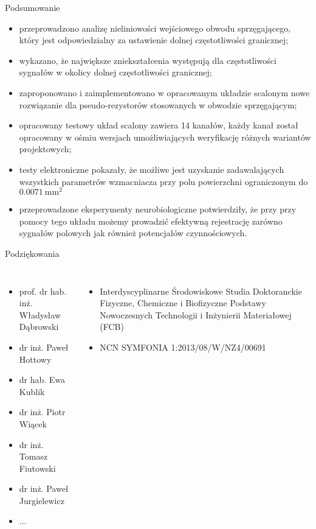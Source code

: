     \begin{frame}{Podsumowanie}
    \begin{itemize}
        \item przeprowadzono analizę nieliniowości wejściowego obwodu sprzęgającego, który jest odpowiedzialny za ustawienie dolnej częstotliwości granicznej;
        \item wykazano, że największe zniekształcenia występują dla częstotliwości sygnałów w okolicy dolnej częstotliwości granicznej;
        \item zaproponowano i zaimplementowano w opracowanym układzie scalonym nowe rozwiązanie dla pseudo-rezystorów stosowanych w obwodzie sprzęgającym;
        \item  opracowany testowy układ scalony zawiera 14 kanałów, każdy kanał został opracowany w ośmiu wersjach umożliwiających weryfikację różnych wariantów projektowych;
        \item testy elektroniczne pokazały, że możliwe jest uzyskanie zadawalających wszystkich parametrów wzmacniacza  przy polu powierzchni  ograniczonym do $\SI{0.0071}{\milli\metre\squared}$ 
        \item przeprowadzone eksperymenty neurobiologiczne potwierdziły, że przy przy pomocy tego układu możemy prowadzić efektywną rejestrację zarówno sygnałów polowych jak również potencjałów czynnościowych.
    \end{itemize}
    \end{frame}

    \begin{frame}{Podziękowania}
      
      \begin{columns}

        \begin{itemize}
          \item prof. dr hab. inż. Władysław Dąbrowski
          \item dr inż. Paweł Hottowy
          \item dr hab. Ewa Kublik
          \item dr inż. Piotr Wiącek
          \item dr inż. Tomasz Fiutowski
          \item dr inż. Paweł Jurgielewicz
          \item ...
        \end{itemize}
    
        \begin{itemize}
          \item Interdyscyplinarne Środowiskowe Studia Doktoranckie Fizyczne, Chemiczne i Biofizyczne Podstawy Nowoczesnych
          Technologii i Inżynierii Materiałowej (FCB)
          \item NCN SYMFONIA 1:2013/08/W/NZ4/00691
        \end{itemize}
    \end{columns}
    \end{frame}